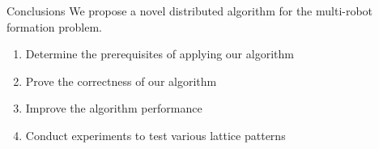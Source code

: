 \begin{frame}{Conclusions}
  We propose a novel distributed algorithm for the multi-robot formation
  problem. 
  \begin{enumerate}
  \item Determine the prerequisites of applying our algorithm
  \item Prove the correctness of our algorithm 
  \item Improve the algorithm performance
  \item Conduct experiments to test various lattice patterns
  \end{enumerate}
\end{frame}